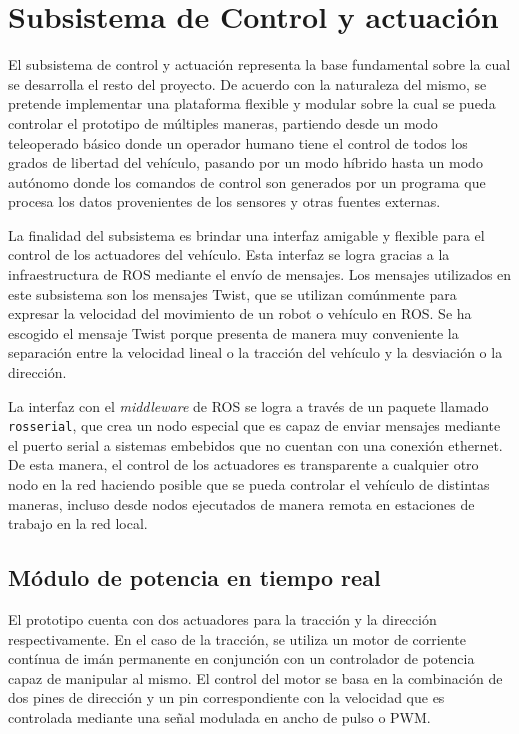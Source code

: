 \section{Subsistema de Control y actuación}\label{sec:control}

El subsistema de control y actuación representa la base fundamental sobre la cual se desarrolla el resto del proyecto. De acuerdo 
con la naturaleza del mismo, se pretende implementar una plataforma flexible y modular sobre la cual se pueda controlar el 
prototipo de múltiples maneras, partiendo desde un modo teleoperado básico donde un operador humano tiene el control 
de todos los grados de libertad del vehículo, pasando por un modo híbrido hasta un modo autónomo donde los comandos de 
control son generados por un programa que procesa los datos provenientes de los sensores y otras fuentes externas.

La finalidad del subsistema es brindar una interfaz amigable y flexible para el control de los actuadores del vehículo. Esta 
interfaz se logra gracias a la infraestructura de ROS mediante el envío de mensajes. Los mensajes utilizados en este subsistema 
son los mensajes Twist, que se utilizan comúnmente para expresar la velocidad del movimiento de un robot o vehículo en ROS. Se ha
escogido el mensaje Twist porque presenta de manera muy conveniente la separación entre la velocidad lineal o 
la tracción del vehículo y la desviación o la dirección. 

La interfaz con el \textit{middleware} de ROS se logra a través de un paquete llamado \lstinline{rosserial}, que crea un nodo especial 
que es capaz de enviar mensajes mediante el puerto serial a sistemas embebidos que no cuentan con una conexión ethernet. De esta 
manera, el control de los actuadores es transparente a cualquier otro nodo en la red haciendo posible que se pueda controlar 
el vehículo de distintas maneras, incluso desde nodos ejecutados de manera remota en estaciones de trabajo en la red local.

    \subsection{Módulo de potencia en tiempo real}
    El prototipo cuenta con dos actuadores para la tracción y la dirección respectivamente. En el caso de la tracción, se 
    utiliza un motor de corriente contínua de imán permanente en conjunción con un controlador de potencia capaz de manipular 
    al mismo. El control del motor se basa en la combinación de dos pines de dirección y un pin correspondiente con la velocidad 
    que es controlada mediante una señal modulada en ancho de pulso o PWM. 

